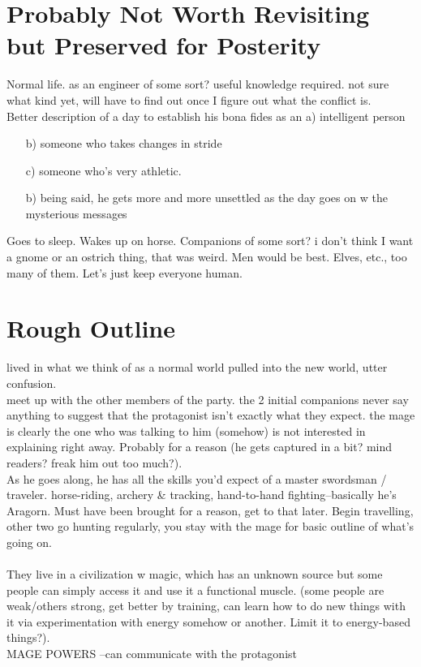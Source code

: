 \section*{Probably Not Worth Revisiting but Preserved for Posterity}

Normal life. as an engineer of some sort? useful knowledge required. not sure what kind yet, will have to find out once I figure out what the conflict is. \\

Better description of a day to establish his bona fides as an a) intelligent person 
\begin{itemize}
\item[b)] someone who takes changes in stride 
\item[c)] someone who's very athletic.  
\item[b)] being said, he gets more and more unsettled as the day goes on w\/ the mysterious messages
\end{itemize}
Goes to sleep. Wakes up on horse. Companions of some sort? i don't think I want a gnome or an ostrich thing, that was weird. Men would be best. Elves, etc., too many of them. Let's just keep everyone human.

\section*{Rough Outline}

lived in what we think of as a normal world
pulled into the new world, utter confusion. \\
meet up with the other members of the party. the 2 initial companions never say anything to suggest that the protagonist isn't exactly what they expect. the mage is clearly the one who was talking to him (somehow) is not interested in explaining right away. Probably for a reason (he gets captured in a bit? mind readers? freak him out too much?).\\ As he goes along, he has all the skills you'd expect of a master swordsman / traveler. horse-riding, archery \& tracking, hand-to-hand fighting--basically he's Aragorn.  Must have been brought for a reason, get to that later. Begin travelling, other two go hunting regularly, you stay with the mage for basic outline of what's going on.  \\\\


They live in a civilization w\/ magic, which has an unknown source but some people can simply access it and use it a functional muscle. (some people are weak/others strong, get better by training, can learn how to do new things with it via experimentation with energy somehow or another. Limit it to energy-based things?).   \\

MAGE POWERS
--can communicate with the protagonist
